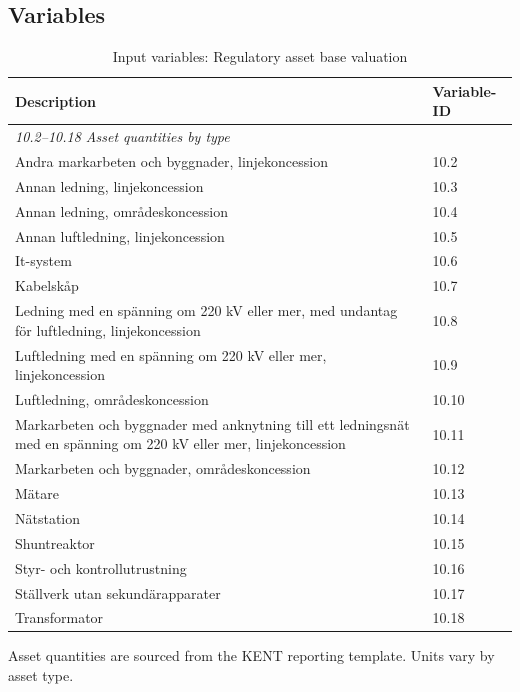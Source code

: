 \subsection{Variables}

\begin{table}[H]
\centering
\footnotesize
\begin{threeparttable}
\caption{Input variables: Regulatory asset base valuation}
\label{tab:rab-variables}
\begin{tabular}{@{}p{9cm}l@{}}
\toprule
\textbf{Description} & \textbf{Variable-ID} \\
\midrule
\multicolumn{2}{l}{\textit{10.2--10.18 Asset quantities by type}} \\
Andra markarbeten och byggnader, linjekoncession & 10.2 \\
Annan ledning, linjekoncession & 10.3 \\
Annan ledning, områdeskoncession & 10.4 \\
Annan luftledning, linjekoncession & 10.5 \\
It-system & 10.6 \\
Kabelskåp & 10.7 \\
Ledning med en spänning om 220 kV eller mer, med undantag för luftledning, linjekoncession & 10.8 \\
Luftledning med en spänning om 220 kV eller mer, linjekoncession & 10.9 \\
Luftledning, områdeskoncession & 10.10 \\
Markarbeten och byggnader med anknytning till ett ledningsnät med en spänning om 220 kV eller mer, linjekoncession & 10.11 \\
Markarbeten och byggnader, områdeskoncession & 10.12 \\
Mätare & 10.13 \\
Nätstation & 10.14 \\
Shuntreaktor & 10.15 \\
Styr- och kontrollutrustning & 10.16 \\
Ställverk utan sekundärapparater & 10.17 \\
Transformator & 10.18 \\
\bottomrule
\end{tabular}
\begin{tablenotes}
\item Asset quantities are sourced from the KENT reporting template. Units vary by asset type.
\end{tablenotes}
\end{threeparttable}
\end{table}

